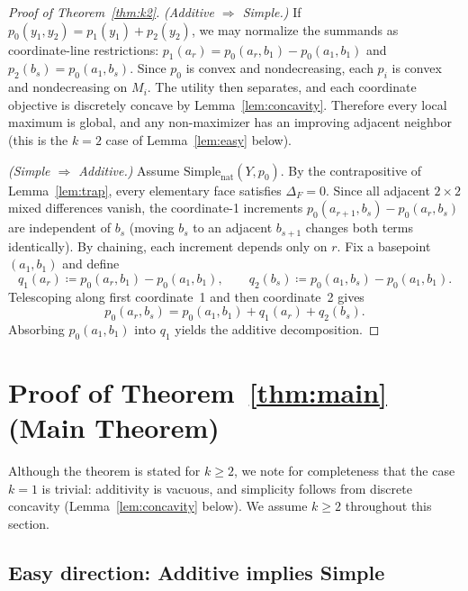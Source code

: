 \documentclass[11pt]{article}
\newcommand{\Simplenat}{\mathrm{Simple}_{\mathrm{nat}}}
\begin{document}
\begin{proof}[Proof of Theorem~\ref{thm:k2}]
\emph{(Additive $\Rightarrow$ Simple.)}
If $p_0(y_1,y_2) = p_1(y_1) + p_2(y_2)$, we may normalize the summands
as coordinate-line restrictions: $p_1(a_r) = p_0(a_r, b_1) - p_0(a_1, b_1)$
and $p_2(b_s) = p_0(a_1, b_s)$.  Since $p_0$ is convex and nondecreasing,
each $p_i$ is convex and nondecreasing on $M_i$.
The utility then separates, and each coordinate objective is discretely
concave by Lemma~\ref{lem:concavity}.
Therefore every local maximum is global, and any non-maximizer has an
improving adjacent neighbor (this is the $k=2$ case of Lemma~\ref{lem:easy}
below).

\emph{(Simple $\Rightarrow$ Additive.)}
Assume $\Simplenat(Y, p_0)$.
By the contrapositive of Lemma~\ref{lem:trap}, every elementary face
satisfies $\Delta_F = 0$.
Since all adjacent $2 \times 2$ mixed differences vanish, the coordinate-1
increments $p_0(a_{r+1}, b_s) - p_0(a_r, b_s)$ are independent of $b_s$
(moving $b_s$ to an adjacent $b_{s+1}$ changes both terms identically).
By chaining, each increment depends only on $r$.
Fix a basepoint $(a_1, b_1)$ and define
\[
  q_1(a_r) \coloneqq p_0(a_r, b_1) - p_0(a_1, b_1),
  \qquad
  q_2(b_s) \coloneqq p_0(a_1, b_s) - p_0(a_1, b_1).
\]
Telescoping along first coordinate~1 and then coordinate~2 gives
\[
  p_0(a_r, b_s) = p_0(a_1, b_1) + q_1(a_r) + q_2(b_s).
\]
Absorbing $p_0(a_1, b_1)$ into $q_1$ yields the additive decomposition.
\end{proof}

\section{Proof of Theorem~\ref{thm:main} (Main Theorem)}\label{sec:proof}

Although the theorem is stated for $k \geq 2$, we note for completeness
that the case $k=1$ is trivial: additivity is vacuous, and simplicity
follows from discrete concavity (Lemma~\ref{lem:concavity} below).
We assume $k \geq 2$ throughout this section.

\subsection{Easy direction: Additive implies Simple}\label{sec:easy}
\end{document}
